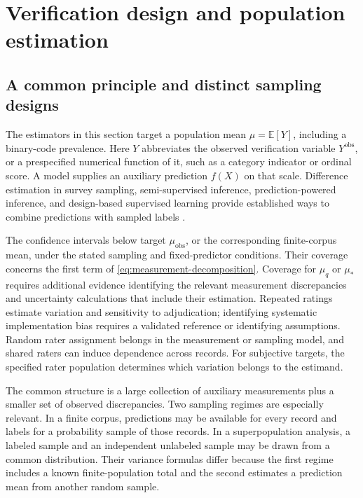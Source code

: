 \documentclass[11pt,a4paper]{article}
\newcommand{\E}{\mathbb{E}}
\begin{document}
\section{Verification design and population estimation}\label{sec:inference}

\subsection{A common principle and distinct sampling designs}

The estimators in this section target a population mean $\mu=\E[Y]$, including a binary-code prevalence. Here $Y$ abbreviates the observed verification variable $Y^{\mathrm{obs}}$, or a prespecified numerical function of it, such as a category indicator or ordinal score. A model supplies an auxiliary prediction $f(X)$ on that scale. Difference estimation in survey sampling, semi-supervised inference, prediction-powered inference, and design-based supervised learning provide established ways to combine predictions with sampled labels \citep{sarndal1992,zhang2019,ppi2023,egami2023}.

The confidence intervals below target $\mu_{\mathrm{obs}}$, or the corresponding finite-corpus mean, under the stated sampling and fixed-predictor conditions. Their coverage concerns the first term of \eqref{eq:measurement-decomposition}. Coverage for $\mu_q$ or $\mu_*$ requires additional evidence identifying the relevant measurement discrepancies and uncertainty calculations that include their estimation. Repeated ratings estimate variation and sensitivity to adjudication; identifying systematic implementation bias requires a validated reference or identifying assumptions. Random rater assignment belongs in the measurement or sampling model, and shared raters can induce dependence across records. For subjective targets, the specified rater population determines which variation belongs to the estimand.

The common structure is a large collection of auxiliary measurements plus a smaller set of observed discrepancies. Two sampling regimes are especially relevant. In a finite corpus, predictions may be available for every record and labels for a probability sample of those records. In a superpopulation analysis, a labeled sample and an independent unlabeled sample may be drawn from a common distribution. Their variance formulas differ because the first regime includes a known finite-population total and the second estimates a prediction mean from another random sample.
\end{document}
